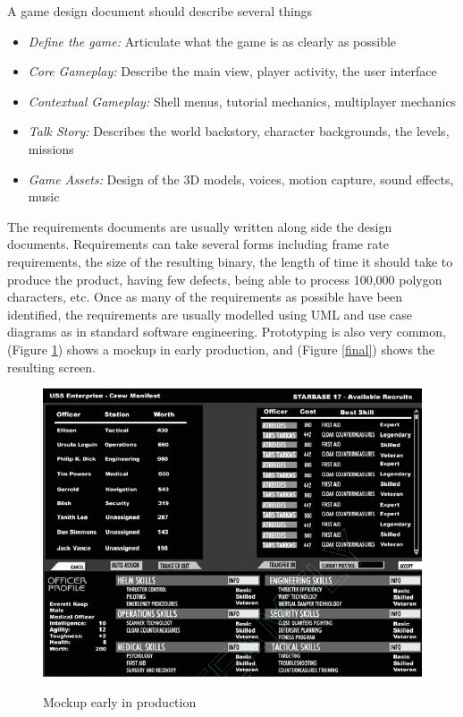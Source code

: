 A game design document should describe several things\cite{bethke2003game}
\begin{itemize}
	\item \emph{Define the game:} Articulate what the game is as clearly as possible
	\item \emph{Core Gameplay:} Describe the main view, player activity, the user interface
	\item \emph{Contextual Gameplay:} Shell menus, tutorial mechanics, multiplayer mechanics
	\item \emph{Talk Story:} Describes the world backstory, character backgrounds, the levels, missions
	\item \emph{Game Assets:} Design of the 3D models, voices, motion capture, sound effects, music
\end{itemize}

The requirements documents are usually written along side the design documents. Requirements can take several forms including\cite{bethke2003game} frame rate requirements, the size of the resulting binary, the length of time it should take to produce the product, having few defects, being able to process 100,000 polygon characters, etc. Once as many of the requirements as possible have been identified, the requirements are usually modelled using UML and use case diagrams as in standard software engineering. Prototyping is also very common, (Figure \ref{mockup}) shows a mockup in early production, and (Figure \ref{final}) shows the resulting screen.

\begin{figure}[!ht]
	\includegraphics[scale=0.5]{Images/mockup}
	\label{mockup}
	\caption{Mockup early in production \cite{bethke2003game}}
\end{figure}

